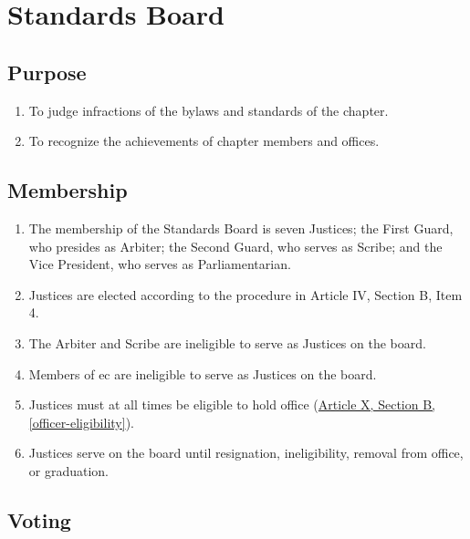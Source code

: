 \chapter{Standards Board}
\label{stds-board}

\section{Purpose}
	\begin{enumerate}
		\item To judge infractions of the bylaws and standards of the chapter.
        \item To recognize the achievements of chapter members and offices.
	\end{enumerate}

\section{Membership}

	\begin{enumerate}
		\item The membership of the Standards Board is seven Justices; the First Guard, who presides as Arbiter; the Second Guard, who serves as Scribe; and the Vice President, who serves as Parliamentarian.
        \item Justices are elected according to the procedure in Article IV, Section B, Item 4.
        \item The Arbiter and Scribe are ineligible to serve as Justices on the board.
		\item Members of \gls{ec} are ineligible to serve as Justices on the board.
		\item Justices must at all times be eligible to hold office (\hyperref[officer-eligibility]{Article X, Section B, \autoref*{officer-eligibility}}). 
		\item Justices serve on the board until resignation, ineligibility, removal from office, or graduation. \label{justice-term}
	\end{enumerate}

\section{Voting}

